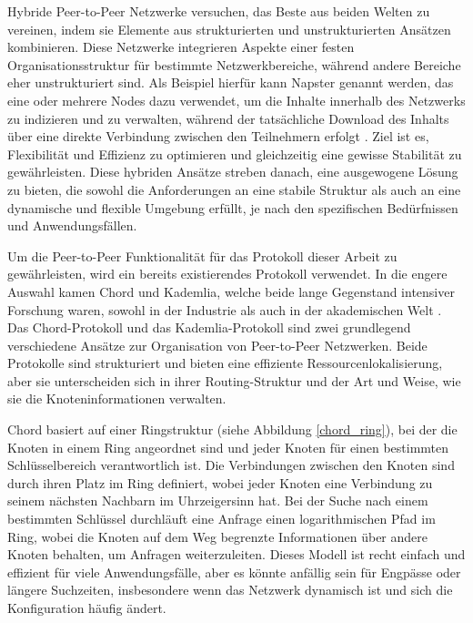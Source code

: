 Hybride Peer-to-Peer Netzwerke versuchen, das Beste aus beiden Welten zu vereinen, indem sie Elemente aus strukturierten und unstrukturierten Ansätzen kombinieren. Diese Netzwerke integrieren Aspekte einer festen Organisationsstruktur für bestimmte Netzwerkbereiche, während andere Bereiche eher unstrukturiert sind. Als Beispiel hierfür kann Napster genannt werden, das eine oder mehrere Nodes dazu verwendet, um die Inhalte innerhalb des Netzwerks zu indizieren und zu verwalten, während der tatsächliche Download des Inhalts über eine direkte Verbindung zwischen den Teilnehmern erfolgt \parencite{Yang_ComparingHybridP2PSystems}.
Ziel ist es, Flexibilität und Effizienz zu optimieren und gleichzeitig eine gewisse Stabilität zu gewährleisten. Diese hybriden Ansätze streben danach, eine ausgewogene Lösung zu bieten, die sowohl die Anforderungen an eine stabile Struktur als auch an eine dynamische und flexible Umgebung erfüllt, je nach den spezifischen Bedürfnissen und Anwendungsfällen.

Um die Peer-to-Peer Funktionalität für das Protokoll dieser Arbeit zu gewährleisten, wird ein bereits existierendes Protokoll verwendet. In die engere Auswahl kamen Chord und Kademlia, welche beide lange Gegenstand intensiver Forschung waren, sowohl in der Industrie als auch in der akademischen Welt \parencite[S. 808]{MedranoChavez_ChordKademliaHighChurnScenarios}. 
Das Chord-Protokoll und das Kademlia-Protokoll sind zwei grundlegend verschiedene Ansätze zur Organisation von Peer-to-Peer Netzwerken. Beide Protokolle sind strukturiert und bieten eine effiziente Ressourcenlokalisierung, aber sie unterscheiden sich in ihrer Routing-Struktur und der Art und Weise, wie sie die Knoteninformationen verwalten.

Chord basiert auf einer Ringstruktur (siehe Abbildung \ref{chord_ring}), bei der die Knoten in einem Ring angeordnet sind und jeder Knoten für einen bestimmten Schlüsselbereich verantwortlich ist. Die Verbindungen zwischen den Knoten sind durch ihren Platz im Ring definiert, wobei jeder Knoten eine Verbindung zu seinem nächsten Nachbarn im Uhrzeigersinn hat. Bei der Suche nach einem bestimmten Schlüssel durchläuft eine Anfrage einen logarithmischen Pfad im Ring, wobei die Knoten auf dem Weg begrenzte Informationen über andere Knoten behalten, um Anfragen weiterzuleiten. Dieses Modell ist recht einfach und effizient für viele Anwendungsfälle, aber es könnte anfällig sein für Engpässe oder längere Suchzeiten, insbesondere wenn das Netzwerk dynamisch ist und sich die Konfiguration häufig ändert.

